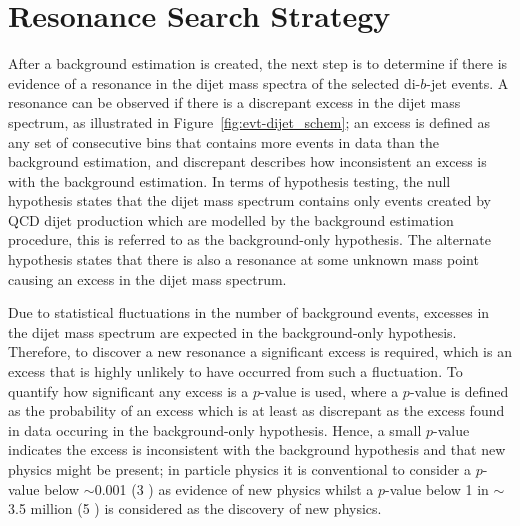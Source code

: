 \section{Resonance Search Strategy}
\label{sec:bkg-bh}

After a background estimation is created, the next step is to determine
if there is evidence of a resonance in the dijet mass spectra of the selected di-$b$-jet events.
A resonance can be observed if there is a discrepant excess in the dijet mass spectrum, as illustrated in Figure~\ref{fig:evt-dijet_schem};
an excess is defined as any set of consecutive bins that contains
more events in data than the background estimation,
and discrepant describes how inconsistent an excess is with the background estimation.
In terms of hypothesis testing,
the null hypothesis states that the dijet mass spectrum contains only events created by QCD dijet production
which are modelled by the background estimation procedure,
this is referred to as the background-only hypothesis.
The alternate hypothesis states that there is also a resonance at some
unknown mass point causing an excess in the dijet mass spectrum.

Due to statistical fluctuations in the number of background events,
excesses in the dijet mass spectrum are expected in the background-only hypothesis.
Therefore, to discover a new resonance a significant excess is required,
which is an excess that is highly unlikely to have occurred from such a fluctuation.
To quantify how significant any excess is a \mbox{$p$-value} is used,
where a \mbox{$p$-value} is defined as the probability of an excess which is at least as discrepant as the excess found in data
occuring in the background-only hypothesis.
Hence, a small \mbox{$p$-value} indicates the excess is inconsistent with the background hypothesis and that new physics might be present;
in particle physics it is conventional to consider a \mbox{$p$-value} below $\sim$0.001 (3 \sigma) as evidence of new physics
whilst a \mbox{$p$-value} below 1 in $\sim$3.5 million (5 \sigma) is considered as the discovery of new physics.


